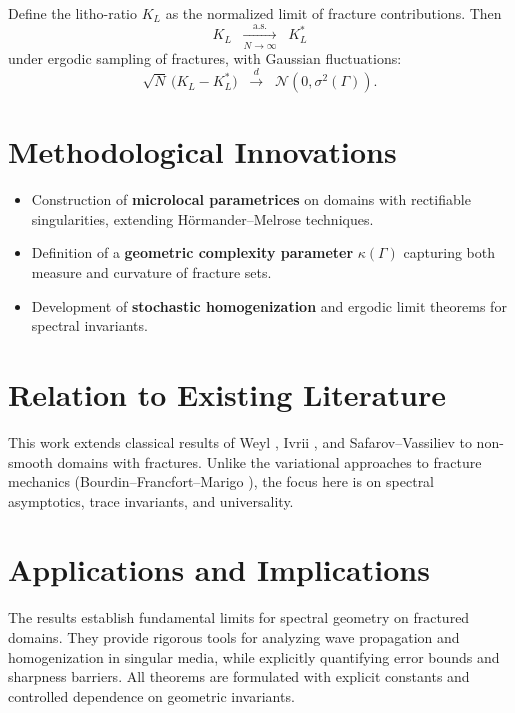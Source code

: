 \begin{theorem}
\label{thm:litho-ratio}
Define the litho-ratio $K_L$ as the normalized limit of fracture contributions.  
Then
\[
K_L \;\;\xrightarrow[N\to\infty]{\text{a.s.}}\;\; K_L^*
\]
under ergodic sampling of fractures, with Gaussian fluctuations:
\[
\sqrt{N}\,\big(K_L - K_L^*\big) \;\;\xrightarrow{d}\;\; \mathcal{N}(0,\sigma^2(\Gamma)).
\]
\end{theorem}

\section*{Methodological Innovations}

\begin{itemize}
    \item Construction of \textbf{microlocal parametrices} on domains with rectifiable singularities, extending Hörmander–Melrose techniques.  
    \item Definition of a \textbf{geometric complexity parameter} $\kappa(\Gamma)$ capturing both measure and curvature of fracture sets.  
    \item Development of \textbf{stochastic homogenization} and ergodic limit theorems for spectral invariants.  
\end{itemize}

\section*{Relation to Existing Literature}

This work extends classical results of Weyl \cite{Weyl1911}, Ivrii \cite{Ivrii1980}, 
and Safarov–Vassiliev \cite{SafarovVassiliev1997} to non-smooth domains with 
fractures.  
Unlike the variational approaches to fracture mechanics (Bourdin–Francfort–Marigo \cite{Bourdin2008}), 
the focus here is on spectral asymptotics, trace invariants, and universality.  

\section*{Applications and Implications}

The results establish fundamental limits for spectral geometry on fractured 
domains.  
They provide rigorous tools for analyzing wave propagation and homogenization 
in singular media, while explicitly quantifying error bounds and sharpness 
barriers.  
All theorems are formulated with explicit constants and controlled dependence 
on geometric invariants.

